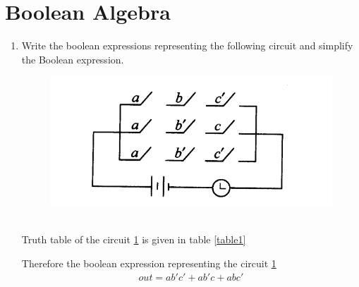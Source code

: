 \documentclass[journal,12pt,twocolumn]{IEEEtran}
\renewcommand\thesection{\arabic{section}}
\begin{document}
\section{Boolean Algebra}
\renewcommand{\theequation}{\theenumi}
\begin{enumerate}[label=\thesection.\arabic*.,ref=\thesection.\theenumi]
\item Write the boolean expressions representing the following circuit and simplify the Boolean expression.
 \begin{figure}[H]
   \centering
   \includegraphics[width=1\columnwidth]{1.png}
   \caption{}
   \label{1}
\end{figure}
\solution\\
Truth table of the circuit \ref{1} is given in table \ref{table1}\\
\begin{table}[htb]
\tiny
 \caption{}
 \label{table1}
 \end{table}
 Therefore the  boolean expression representing the circuit \ref{1}
 \begin{align}
 out = ab'c'+ab'c+abc'
 \end{align} 


\end{enumerate}
\end{document}
